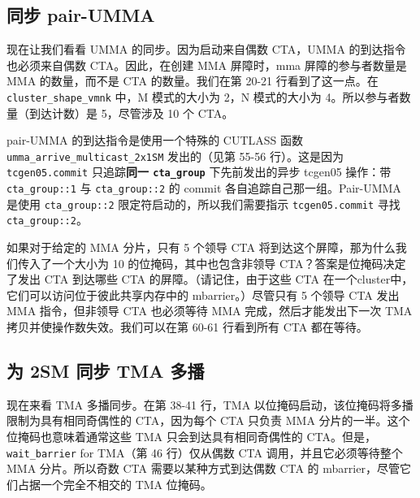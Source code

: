 \subsection{同步 pair-UMMA}

现在让我们看看 UMMA 的同步。因为启动来自偶数 CTA，UMMA 的到达指令也必须来自偶数 CTA。因此，在创建 MMA 屏障时，mma 屏障的参与者数量是 MMA 的数量，而不是 CTA 的数量。我们在第 20-21 行看到了这一点。在 \texttt{cluster\_\allowbreak{}shape\_\allowbreak{}vmnk} 中，M 模式的大小为 2，N 模式的大小为 4。所以参与者数量（到达计数）是 5，尽管涉及 10 个 CTA。

pair-UMMA 的到达指令是使用一个特殊的 CUTLASS 函数 \texttt{u\allowbreak{}m\allowbreak{}m\allowbreak{}a\allowbreak{}\_\allowbreak{}a\allowbreak{}r\allowbreak{}r\allowbreak{}i\allowbreak{}v\allowbreak{}e\allowbreak{}\_\allowbreak{}m\allowbreak{}u\allowbreak{}l\allowbreak{}t\allowbreak{}i\allowbreak{}c\allowbreak{}a\allowbreak{}s\allowbreak{}t\allowbreak{}\_\allowbreak{}2\allowbreak{}x\allowbreak{}1\allowbreak{}S\allowbreak{}M} 发出的（见第 55-56 行）。这是因为 \texttt{tcgen05.\allowbreak{}commit} 只追踪\textbf{同一 \texttt{cta\_\allowbreak{}group}} 下先前发出的异步 tcgen05 操作：带 \texttt{cta\_\allowbreak{}group::\allowbreak{}1} 与 \texttt{cta\_\allowbreak{}group::\allowbreak{}2} 的 commit 各自追踪自己那一组。Pair-UMMA 是使用 \texttt{cta\_\allowbreak{}group::\allowbreak{}2} 限定符启动的，所以我们需要指示 \texttt{tcgen05.\allowbreak{}commit} 寻找 \texttt{cta\_\allowbreak{}group::\allowbreak{}2}。

如果对于给定的 MMA 分片，只有 5 个领导 CTA 将到达这个屏障，那为什么我们传入了一个大小为 10 的位掩码，其中也包含非领导 CTA？答案是位掩码决定了发出 CTA 到达哪些 CTA 的屏障。（请记住，由于这些 CTA 在一个cluster中，它们可以访问位于彼此共享内存中的 mbarrier。）尽管只有 5 个领导 CTA 发出 MMA 指令，但非领导 CTA 也必须等待 MMA 完成，然后才能发出下一次 TMA 拷贝并使操作数失效。我们可以在第 60-61 行看到所有 CTA 都在等待。

\subsection{为 2SM 同步 TMA 多播}

现在来看 TMA 多播同步。在第 38-41 行，TMA 以位掩码启动，该位掩码将多播限制为具有相同奇偶性的 CTA，因为每个 CTA 只负责 MMA 分片的一半。这个位掩码也意味着通常这些 TMA 只会到达具有相同奇偶性的 CTA。但是，\texttt{wait\_\allowbreak{}barrier} for TMA（第 46 行）仅从偶数 CTA 调用，并且它必须等待整个 MMA 分片。所以奇数 CTA 需要以某种方式到达偶数 CTA 的 mbarrier，尽管它们占据一个完全不相交的 TMA 位掩码。

